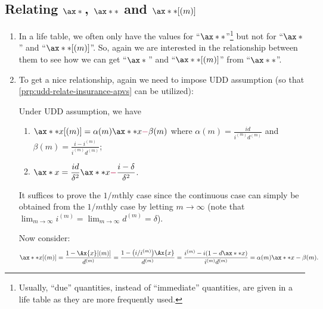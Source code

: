 \subsection{Relating \(\ax*{}\), \(\ax**{}\) and \(\ax**{}[(m)]\)}
\begin{enumerate}
\item In a life table, we often only have the values for
``\(\ax**{}\)''\footnote{Usually, ``due'' quantities, instead of ``immediate''
quantities, are given in a life table as they are more frequently used.} but
not for ``\(\ax*{}\)'' and ``\(\ax**{}[(m)]\)''. So, again we are interested in
the relationship between them to see how we can get ``\(\ax*{}\)'' and
``\(\ax**{}[(m)]\)'' from ``\(\ax**{}\)''.
\item To get a nice relationship, again we need to impose UDD assumption (so
that \cref{prp:udd-relate-insurance-apvs} can be utilized):
\begin{proposition}
\label{prp:udd-relate-annuity-apvs}
Under UDD assumption, we have
\begin{enumerate}
\item \(\ax**{x}[(m)]=\alpha(m)\ax**{x}{\color{purple}-}\beta(m)\)
where \(\displaystyle \alpha(m)=\frac{id}{i^{(m)}d^{(m)}}\) and \(\displaystyle \beta(m)=\frac{i-i^{(m)}}{i^{(m)}d^{(m)}}\);
\item \(\displaystyle \ax*{x}=\frac{id}{\delta^2}\ax**{x}{\color{purple}-}\frac{i-\delta}{\delta^2}\).
\end{enumerate}
\end{proposition}
\begin{pf}
It suffices to prove the \(1/m\)thly case since the continuous case can simply
be obtained from the \(1/m\)thly case by letting \(m\to\infty\) (note that
\(\lim_{m\to \infty}i^{(m)}=\lim_{m\to \infty}d^{(m)}=\delta\)).

Now consider:
\[
\ax**{x}[(m)]
=\frac{1-\Ax{x}[(m)]}{d^{(m)}}
=\frac{1-\qty(i/i^{(m)})\Ax{x}}{d^{(m)}}
=\frac{i^{(m)}-i(1-d\ax**{x})}{i^{(m)}d^{(m)}}
=\alpha(m)\ax**{x}-\beta(m).
\]
\end{pf}


\end{enumerate}
